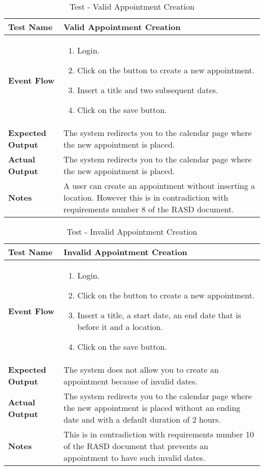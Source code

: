 \begin{table}[h]	
\centering
\def\arraystretch{1.5}
\begin{tabular}{|m{7cm}|m{7cm}|}
	\hline
	\textbf{Test Name}            & Valid Appointment Creation   \\ \hline
	\textbf{Event Flow}             & 
	 	\begin{enumerate}
	 	\item Login.
	 	\item Click on the button to create a new appointment.
	 	\item Insert a title and two subsequent dates.
	 	\item Click on the save button.
	 \end{enumerate} \\ \hline
	\textbf{Expected Output}  &  The system redirects you to the calendar page where the new appointment is placed.   \\ \hline
	\textbf{Actual Output}       & The system redirects you to the calendar page where the new appointment is placed.    \\ \hline
	\textbf{Notes} & A user can create an appointment without inserting a location. However this is in contradiction with requirements number 8 of the RASD document. \\ \hline
\end{tabular}
\caption{Test - Valid Appointment Creation}
\end{table}


\begin{table}[h]	
	\centering
	\def\arraystretch{1.5}
	\begin{tabular}{|m{7cm}|m{7cm}|}
		\hline
		\textbf{Test Name}            & Invalid Appointment Creation   \\ \hline
		\textbf{Event Flow}             & 
		\begin{enumerate}
			\item Login.
			\item Click on the button to create a new appointment.
			\item Insert a title, a start date, an end date that is before it and a location.
			\item Click on the save button.
		\end{enumerate} \\ \hline
		\textbf{Expected Output}  &  The system does not allow you to create an appointment because of invalid dates.   \\ \hline
		\textbf{Actual Output}       & The system redirects you to the calendar page where the new appointment is placed without an ending date and with a default duration of 2 hours.    \\ \hline
		\textbf{Notes} & This is in contradiction with requirements number 10 of the RASD document that prevents an appointment to have such invalid dates. \\ \hline
	\end{tabular}
	\caption{Test - Invalid Appointment Creation}
\end{table}


